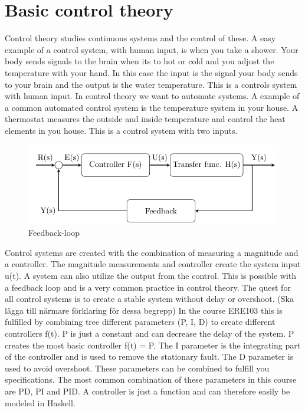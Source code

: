 \section{Basic control theory}

Control theory studies continuous systems and the control of these. A easy example of a control system, with human input, is when you take a shower. Your body sends signals to the brain when its to hot or cold and you adjust the temperature with your hand. In this case the input is the signal your body sends to your brain and the output is the water temperature. This is a controls system with human input. In control theory we want to automate systems. A example of a common automated control system is the temperature system in your house. A thermostat measures the outside and inside temperature and control the heat elements in you house. This is a control system with two inputs.

\begin{figure}[H]
    \centering
    \includegraphics[]{feedback.PNG}
    \caption{Feedback-loop}
    \label{fig:feed}
\end{figure}


Control systems are created with the combination of measuring a magnitude and a controller. The magnitude measurements and controller create the system input u(t). A system can also utilize the output from the control. This is possible with a feedback loop and is a very common practice in control theory. The quest for all control systems is to create a stable system without delay or overshoot. (Ska lägga till närmare förklaring för dessa begrepp) In the course ERE103 this is fulfilled by combining tree different parameters (P, I, D) to create different controllers f(t).  P is just a constant and can decrease the delay of the system. P creates the most basic controller f(t) = P. The I parameter is the integrating part of the controller and is used to remove the stationary fault. The D parameter is used to avoid overshoot. These parameters can be combined to fulfill you specifications.  The most common combination of these parameters in this course are PD, PI and PID. A controller is just a function and can therefore easily be modeled in Haskell.



